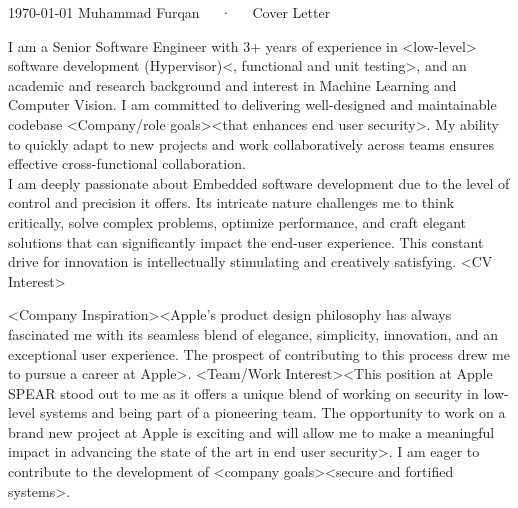 \documentclass[11pt, a4paper]{awesome-cv}
\begin{document}
\makecvheader[R]

\makecvfooter
  {\today}
  {Muhammad Furqan~~~·~~~Cover Letter}
  {}

\makelettertitle

\begin{cvletter}

I am a Senior Software Engineer with 3+ years of experience in <low-level> software development (Hypervisor)<, functional and unit testing>, and an academic and research background and interest in Machine Learning and Computer Vision. I am committed to delivering well-designed and maintainable codebase <Company/role goals><that enhances end user security>. My ability to quickly adapt to new projects and work collaboratively across teams ensures effective cross-functional collaboration.
\vspace{5pt}
\\
I am deeply passionate about Embedded software development due to the level of control and precision it offers. Its intricate nature challenges me to think critically, solve complex problems, optimize performance, and craft elegant solutions that can significantly impact the end-user experience. This constant drive for innovation is intellectually stimulating and creatively satisfying. <CV Interest> 

<Company Inspiration><Apple's product design philosophy has always fascinated me with its seamless blend of elegance, simplicity, innovation, and an exceptional user experience. The prospect of contributing to this process drew me to pursue a career at Apple>. <Team/Work Interest><This position at Apple SPEAR stood out to me as it offers a unique blend of working on security in low-level systems and being part of a pioneering team. The opportunity to work on a brand new project at Apple is exciting and will allow me to make a meaningful impact in advancing the state of the art in end user security>. I am eager to contribute to the development of <company goals><secure and fortified systems>.


\end{cvletter}
\end{document}
